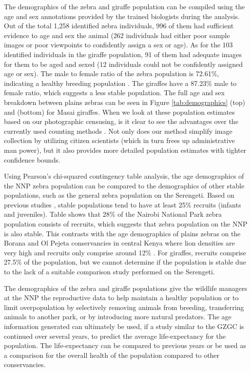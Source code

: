 The demographics of the zebra and giraffe population can be compiled using the age and sex annotations provided by the trained biologists during the analysis.  Out of the total 1,258 identified zebra individuals, 996 of them had sufficient evidence to age and sex the animal (262 individuals had either poor sample images or poor viewpoints to confidently assign a sex or age).  As for the 103 identified individuals in the giraffe population, 91 of them had adequate images for them to be aged and sexed (12 individuals could not be confidently assigned age or sex).  The male to female ratio of the zebra population is 72.61\%, indicating a healthy breeding population \cite{hack_status_2002}.  The giraffes have a  87.23\% male to female ratio, which suggests a less stable population. %
The full age and sex breakdown between plains zebras can be seen in Figure \ref{tab:demographics} (top) and (bottom) for Masai giraffes.  When we look at these population estimates based on our photographic censusing, is it clear to see the advantages over the currently used counting methods \cite{ogutu_changing_2013}.  Not only does our method simplify image collection by utilizing citizen scientists (which in turn frees up administrative man power), but it also provides more detailed population estimates with tighter confidence bounds.

Using Pearson's chi-squared \cite{rao_analysis_1981, plackett_karl_1983} contingency table analysis, the age demographics of the NNP zebra population can be compared to the demographics of other stable populations, such as the general zebra population on the Serengeti.  Based on previous studies \cite{rubenstein_chapter_2010, sinclair_density_1996, fitzgibbon_antipredator_1995}, stable populations tend to have at least 25\% recruits (infants and juveniles).  Table \label{tab:demographics-pz} shows that 28\% of the Nairobi National Park zebra population consists of recruits, which suggests that zebra population on the NNP is also stable. This contrasts with the age demographics of plains zebras on the Borana and Ol Pejeta conservancies in central Kenya where lion densities are very high and recruits only comprise around 12\% \cite{rubenstein_chapter_2010}.  For giraffes, recruits comprise 27.5\% of the population, but we cannot determine if the population is stable due to the lack of a suitable comparison study performed on the Serengeti.

The demographics of the zebra and giraffe populations give the wildlife managers at the NNP the reproductive data to help maintain a healthy population or to limit overpopulation by selectively removing animals from breeding, transferring animals to another park, or by introducing more natural predators.  The age information generated can ultimately be used, if a study similar to the GZGC is continued over several years, to predict the average life-expectancy for the population.  The life-expectancy can be compared to previous years or be used as a comparison for the overall health of the population compared to other conservancies.

